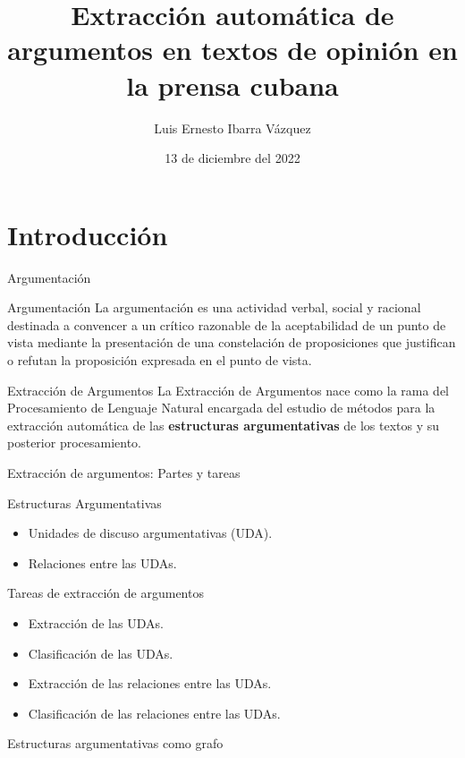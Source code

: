 \documentclass{beamer}
\title{Extracción automática de argumentos en textos de opinión en la prensa cubana}
\author{Luis Ernesto Ibarra Vázquez}
\institute{Universidad de La Habana}
\date{13 de diciembre del 2022}
\begin{document}
\begin{frame}
    \titlepage 
\end{frame}

\logo{}


\section{Introducción}
\begin{frame}{Argumentación}
    \begin{block}{Argumentación}
        La argumentación es una actividad verbal, social y racional destinada a convencer
        a un crítico razonable de la aceptabilidad de un punto de vista mediante la presentación 
        de una constelación de proposiciones que justifican o refutan la proposición
        expresada en el punto de vista.
    \end{block}
    \pause 
    \begin{block}{Extracción de Argumentos}
        La Extracción de Argumentos nace como la rama del Procesamiento de Lenguaje Natural encargada del
        estudio de métodos para la extracción automática de las \textbf{estructuras argumentativas}
        de los textos y su posterior procesamiento.
    \end{block}
\end{frame}
\begin{frame}{Extracción de argumentos: Partes y tareas}
    \begin{block}{Estructuras Argumentativas}
        \begin{itemize}
            \pause
            \item Unidades de discuso argumentativas (UDA).
            \pause
            \item Relaciones entre las UDAs.
        \end{itemize}
    \end{block}
    \pause
    \begin{block}{Tareas de extracción de argumentos}
        \begin{itemize}
            \pause
            \item Extracción de las UDAs.
            \pause
            \item Clasificación de las UDAs.
            \pause
            \item Extracción de las relaciones entre las UDAs.
            \pause
            \item Clasificación de las relaciones entre las UDAs.
        \end{itemize}
    \end{block}
\end{frame}
\begin{frame}{Estructuras argumentativas como grafo}
    
\end{frame}
\end{document}
